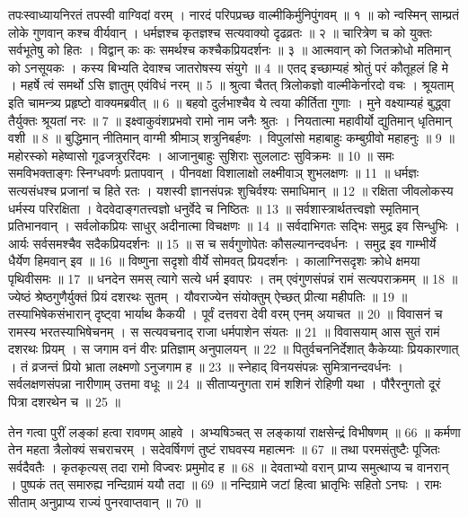 तपःस्वाध्यायनिरतं तपस्वी वाग्विदां वरम् । नारदं परिपप्रच्छ वाल्मीकिर्मुनिपुंगवम् ॥ १ ॥
को न्वस्मिन् साम्प्रतं लोके गुणवान् कश्च वीर्यवान् । धर्मज्ञश्च कृतज्ञश्च सत्यवाक्यो दृढव्रतः ॥ २ ॥
चारित्रेण च को युक्तः सर्वभूतेषु को हितः । विद्वान् कः कः समर्थश्च कश्चैकप्रियदर्शनः ॥ ३ ॥
आत्मवान् को जितक्रोधो मतिमान् को ऽनसूयकः । कस्य बिभ्यति देवाश्च जातरोषस्य संयुगे ॥ 4 ॥
एतद् इच्छाम्यहं श्रोतुं परं कौतूहलं हि मे । महर्षे त्वं समर्थो ऽसि ज्ञातुम् एवंविधं नरम् ॥ 5 ॥
श्रुत्वा चैतत् त्रिलोकज्ञो वाल्मीकेर्नारदो वचः । श्रूयताम् इति चामन्त्र्य प्रहृष्टो वाक्यमब्रवीत् ॥ 6 ॥
बहवो दुर्लभाश्चैव ये त्वया कीर्तिता गुणाः । मुने वक्ष्याम्यहं बुद्ध्वा तैर्युक्तः श्रूयतां नरः ॥ 7 ॥
इक्ष्वाकुवंशप्रभवो रामो नाम जनैः श्रुतः । नियतात्मा महावीर्यो द्युतिमान् धृतिमान् वशी ॥ 8 ॥
बुद्धिमान् नीतिमान् वाग्मी श्रीमाञ् शत्रुनिबर्हणः । विपुलांसो महाबाहुः कम्बुग्रीवो महाहनुः ॥ 9 ॥
महोरस्को महेष्वासो गूढजत्रुररिंदमः । आजानुबाहुः सुशिराः सुललाटः सुविक्रमः ॥ 10 ॥
समः समविभक्ताङ्गः स्निग्धवर्णः प्रतापवान् । पीनवक्षा विशालाक्षो लक्ष्मीवाञ् शुभलक्षणः ॥ 11 ॥
धर्मज्ञः सत्यसंधश्च प्रजानां च हिते रतः । यशस्वी ज्ञानसंपन्नः शुचिर्वश्यः समाधिमान् ॥ 12 ॥
रक्षिता जीवलोकस्य धर्मस्य परिरक्षिता । वेदवेदाङ्गतत्त्वज्ञो धनुर्वेदे च निष्ठितः ॥ 13 ॥
सर्वशास्त्रार्थतत्त्वज्ञो स्मृतिमान् प्रतिभानवान् । सर्वलोकप्रियः साधुर् अदीनात्मा विचक्षणः ॥ 14 ॥
सर्वदाभिगतः सद्भिः समुद्र इव सिन्धुभिः । आर्यः सर्वसमश्चैव सदैकप्रियदर्शनः ॥ 15 ॥
स च सर्वगुणोपेतः कौसल्यानन्दवर्धनः । समुद्र इव गाम्भीर्ये धैर्येण हिमवान् इव ॥ 16 ॥
विष्णुना सदृशो वीर्ये सोमवत् प्रियदर्शनः । कालाग्निसदृशः क्रोधे क्षमया पृथिवीसमः ॥ 17 ॥
धनदेन समस् त्यागे सत्ये धर्म इवापरः । तम् एवंगुणसंपन्नं रामं सत्यपराक्रमम् ॥ 18 ॥
ज्येष्ठं श्रेष्ठगुणैर्युक्तं प्रियं दशरथः सुतम् । यौवराज्येन संयोक्तुम् ऐच्छत् प्रीत्या महीपतिः ॥ 19 ॥
तस्याभिषेकसंभारान् दृष्ट्वा भार्याथ कैकयी । पूर्वं दत्तवरा देवी वरम् एनम् अयाचत ॥ 20 ॥
विवासनं च रामस्य भरतस्याभिषेचनम् । स सत्यवचनाद् राजा धर्मपाशेन संयतः ॥ 21 ॥
विवासयाम् आस सुतं रामं दशरथः प्रियम् । स जगाम वनं वीरः प्रतिज्ञाम् अनुपालयन् ॥ 22 ॥
पितुर्वचननिर्देशात् कैकेय्याः प्रियकारणात् । तं व्रजन्तं प्रियो भ्राता लक्ष्मणो ऽनुजगाम ह ॥ 23 ॥
स्नेहाद् विनयसंपन्नः सुमित्रानन्दवर्धनः । सर्वलक्षणसंपन्ना नारीणाम् उत्तमा वधूः ॥ 24 ॥
सीताप्यनुगता रामं शशिनं रोहिणी यथा । पौरैरनुगतो दूरं पित्रा दशरथेन च ॥ 25 ॥

\medskip
तेन गत्वा पुरीं लङ्कां हत्वा रावणम् आहवे । अभ्यषिञ्चत् स लङ्कायां राक्षसेन्द्रं विभीषणम् ॥ 66 ॥
कर्मणा तेन महता त्रैलोक्यं सचराचरम् । सदेवर्षिगणं तुष्टं राघवस्य महात्मनः ॥ 67 ॥
तथा परमसंतुष्टैः पूजितः सर्वदैवतैः । कृतकृत्यस् तदा रामो विज्वरः प्रमुमोद ह ॥ 68  ॥
देवताभ्यो वरान् प्राप्य समुत्थाप्य च वानरान् । पुष्पकं तत् समारुह्य नन्दिग्रामं ययौ तदा ॥ 69 ॥
नन्दिग्रामे जटां हित्वा भ्रातृभिः सहितो ऽनघः । रामः सीताम् अनुप्राप्य राज्यं पुनरवाप्तवान् ॥ 70  ॥

\bye
